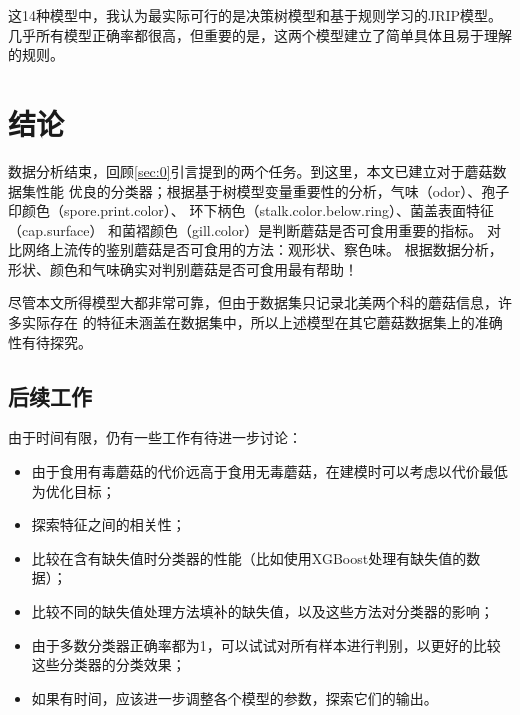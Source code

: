 \documentclass[lang=cn,11pt,a4paper,cite=super]{elegantpaper}
\begin{document}
\begin{table}[htb]
   \centering
   \caption{其它模型正确率}
   \label{tab:acc2}
\end{table}

这14种模型中，我认为最实际可行的是决策树模型和基于规则学习的JRIP模型。
几乎所有模型正确率都很高，但重要的是，这两个模型建立了简单具体且易于理解的规则。

\section{结论}
 数据分析结束，回顾\ref{sec:0}引言提到的两个任务。到这里，本文已建立对于蘑菇数据集性能
 优良的分类器；根据基于树模型变量重要性的分析，气味（odor）、孢子印颜色（spore.print.color）、
 环下柄色（stalk.color.below.ring）、菌盖表面特征（cap.surface）
 和菌褶颜色（gill.color）是判断蘑菇是否可食用重要的指标。
 对比网络上流传的鉴别蘑菇是否可食用的方法：观形状、察色味。
根据数据分析，形状、颜色和气味确实对判别蘑菇是否可食用最有帮助！
 \par 尽管本文所得模型大都非常可靠，但由于数据集只记录北美两个科的蘑菇信息，许多实际存在
 的特征未涵盖在数据集中，所以上述模型在其它蘑菇数据集上的准确性有待探究。
\subsection{后续工作}
由于时间有限，仍有一些工作有待进一步讨论：
\begin{itemize}
   \item 由于食用有毒蘑菇的代价远高于食用无毒蘑菇，在建模时可以考虑以代价最低为优化目标；
   \item 探索特征之间的相关性；
   \item 比较在含有缺失值时分类器的性能（比如使用XGBoost处理有缺失值的数据）；
   \item 比较不同的缺失值处理方法填补的缺失值，以及这些方法对分类器的影响；
   \item 由于多数分类器正确率都为1，可以试试对所有样本进行判别，以更好的比较这些分类器的分类效果；
   \item 如果有时间，应该进一步调整各个模型的参数，探索它们的输出。
\end{itemize}
\end{document}
